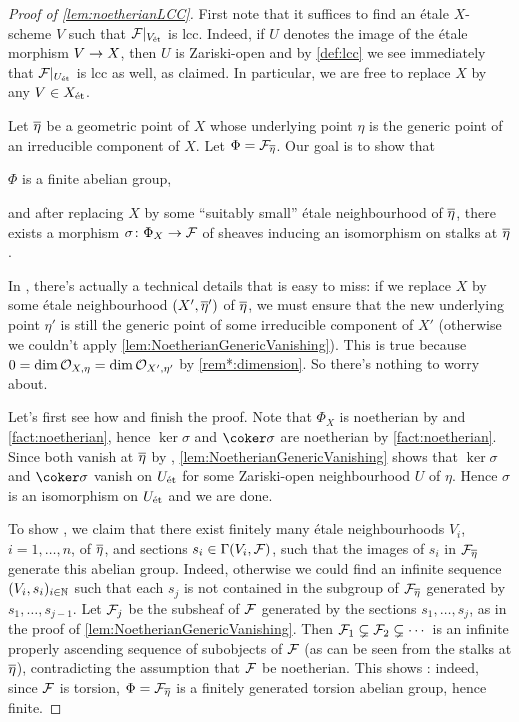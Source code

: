 \begin{proof}[Proof of \cref{lem:noetherianLCC}]
	First note that it suffices to find an étale $X$-scheme $V$ such that $\mathcal{F}|_{V_{\mathrm{\acute{e}t}}}$ is lcc. Indeed, if $U$ denotes the image of the étale morphism $V\morphism X$, then $U$ is Zariski-open and by \cref{def:lcc} we see immediately that $\mathcal{F}|_{U_{\mathrm{\acute{e}t}}}$ is lcc as well, as claimed. In particular, we are free to replace $X$ by any $V\in X_{\mathrm{\acute{e}t}}$.
	
	Let $\ov{\eta}$ be a geometric point of $X$ whose underlying point $\eta$ is the generic point of an irreducible component of $X$. Let $\Phi=\Ff_{\ov{\eta}}$. Our goal is to show that
	\begin{numerate}
		\item $\Phi$ is a finite abelian group,
		\item and after replacing $X$ by some \enquote{suitably small} étale neighbourhood of $\ov{\eta}$, there exists a morphism $\sigma\colon \Phi_X\morphism \Ff$ of sheaves inducing an isomorphism on stalks at $\ov{\eta}$.
	\end{numerate}
	In , there's actually a technical details that is easy to miss: if we replace $X$ by some étale neighbourhood $(X',\ov{\eta}')$ of $\ov{\eta}$, we must ensure that the new underlying point $\eta'$ is still the generic point of some irreducible component of $X'$ (otherwise we couldn't apply \cref{lem:NoetherianGenericVanishing}). This is true because $0=\dim \mathcal{O}_{X,\eta}=\dim \mathcal{O}_{X',\eta'}$ by \cref{rem*:dimension}. So there's nothing to worry about.
	
	Let's first see how  and  finish the proof. Note that $\Phi_X$ is noetherian by  and \cref{fact:noetherian}, hence $\ker\sigma$ and $\coker\sigma$ are noetherian by \cref{fact:noetherian}. Since both vanish at $\ov{\eta}$ by , \cref{lem:NoetherianGenericVanishing} shows that $\ker\sigma$ and $\coker\sigma$ vanish on $U_{\mathrm{\acute{e}t}}$ for some Zariski-open neighbourhood $U$ of $\eta$. Hence $\sigma$ is an isomorphism on $U_{\mathrm{\acute{e}t}}$ and we are done.
	
	To show , we claim that there exist finitely many étale neighbourhoods $V_i$, $i=1,\dotsc,n$, of $\ov{\eta}$, and sections $s_i\in \operatorname{\Gamma}(V_i,\mathcal{F})$, such that the images of $s_i$ in $\Ff_{\ov{\eta}}$ generate this abelian group. Indeed, otherwise we could find an infinite sequence $(V_i,s_i)_{i\in \mathbb{N}}$ such that each $s_j$ is not contained in the subgroup of $\Ff_{\ov{\eta}}$ generated by $s_1,\dotsc,s_{j-1}$. Let $\mathcal{F}_j$ be the subsheaf of $\mathcal{F}$ generated by the sections $s_1,\dotsc,s_j$, as in the proof of \cref{lem:NoetherianGenericVanishing}. Then $\mathcal{F}_1\subsetneq \mathcal{F}_2\subsetneq \dotsb$ is an infinite properly ascending sequence of subobjects of $\mathcal{F}$ (as can be seen from the stalks at $\ov{\eta}$), contradicting the assumption that $\mathcal{F}$ be noetherian. This shows : indeed, since $\mathcal{F}$ is torsion, $\Phi=\Ff_{\ov{\eta}}$ is a finitely generated torsion abelian group, hence finite.
	

\end{proof}
